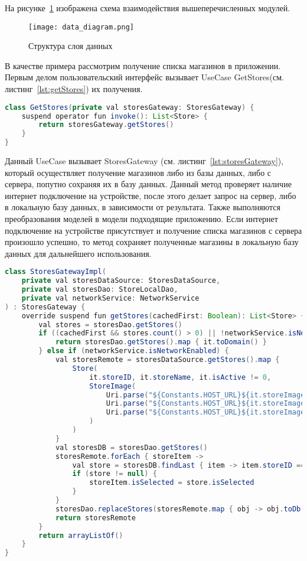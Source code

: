 На рисунке~\ref{fig:arch:data_diagram} изображена схема взаимодействия вышеперечисленных модулей.
 
\begin{figure}[H]
 \centering
   \texttt{[image: data\_diagram.png]} 
   \caption{Структура слоя данных}
   \label{fig:arch:data_diagram}
\end{figure}
 
В качестве примера рассмотрим получение списка магазинов в приложении. Первым делом пользовательский интерфейс вызывает UseCase GetStores(см. листинг~\ref{lst:getStores}) их получения.

\begin{lstlisting}[language=Java,label={lst:getStores},caption={UseCase GetStores}]
class GetStores(private val storesGateway: StoresGateway) {
    suspend operator fun invoke(): List<Store> {
        return storesGateway.getStores()
    }
}
\end{lstlisting}

Данный UseCase вызывает StoresGateway (см. листинг~\ref{lst:storesGateway}), который осуществляет получение магазинов либо из базы данных, либо с сервера, попутно сохраняя их в базу данных. Данный метод проверяет наличие интернет подключение на устройстве, после этого делает запрос на сервер, либо в локальную базу данных, в зависимости от результата. Также выполняются преобразования моделей в модели подходящие приложению. Если интернет подключение на устройстве присутствует и получение списка магазинов с сервера произошло успешно, то метод сохраняет полученные магазины в локальную базу данных для дальнейшего использования.
\begin{lstlisting}[language=Java,label={lst:storesGateway},caption={StoresGateway}]
class StoresGatewayImpl(
    private val storesDataSource: StoresDataSource,
    private val storesDao: StoreLocalDao,
    private val networkService: NetworkService
) : StoresGateway {
    override suspend fun getStores(cachedFirst: Boolean): List<Store> {
        val stores = storesDao.getStores()
        if ((cachedFirst && stores.count() > 0) || !networkService.isNetworkEnabled) {
            return storesDao.getStores().map { it.toDomain() }
        } else if (networkService.isNetworkEnabled) {
            val storesRemote = storesDataSource.getStores().map {
                Store(
                    it.storeID, it.storeName, it.isActive != 0,
                    StoreImage(
                        Uri.parse("${Constants.HOST_URL}${it.storeImage.bannerPath}"),
                        Uri.parse("${Constants.HOST_URL}${it.storeImage.logoPath}"),
                        Uri.parse("${Constants.HOST_URL}${it.storeImage.iconPath}")
                    )
                )
            }
            val storesDB = storesDao.getStores()
            storesRemote.forEach { storeItem ->
                val store = storesDB.findLast { item -> item.storeID == storeItem.id }
                if (store != null) {
                    storeItem.isSelected = store.isSelected
                }
            }
            storesDao.replaceStores(storesRemote.map { obj -> obj.toDb() })
            return storesRemote
        }
        return arrayListOf()
    }
}

\end{lstlisting}


